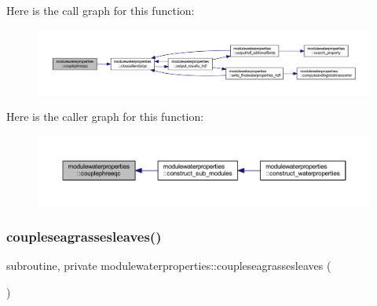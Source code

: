 Here is the call graph for this function\+:\nopagebreak
\begin{figure}[H]
\begin{center}
\leavevmode
\includegraphics[width=350pt]{namespacemodulewaterproperties_a191c738815d3d3376105cfd51b26b59d_cgraph}
\end{center}
\end{figure}
Here is the caller graph for this function\+:\nopagebreak
\begin{figure}[H]
\begin{center}
\leavevmode
\includegraphics[width=350pt]{namespacemodulewaterproperties_a191c738815d3d3376105cfd51b26b59d_icgraph}
\end{center}
\end{figure}
\mbox{\label{namespacemodulewaterproperties_ad4fbcdc5c8f0cd8982dbe65a88f54ab8}} 
\subsubsection{\texorpdfstring{coupleseagrassesleaves()}{coupleseagrassesleaves()}}
{\footnotesize\ttfamily subroutine, private modulewaterproperties\+::coupleseagrassesleaves (\begin{DoxyParamCaption}{ }\end{DoxyParamCaption})\hspace{0.3cm}{\ttfamily [private]}}

